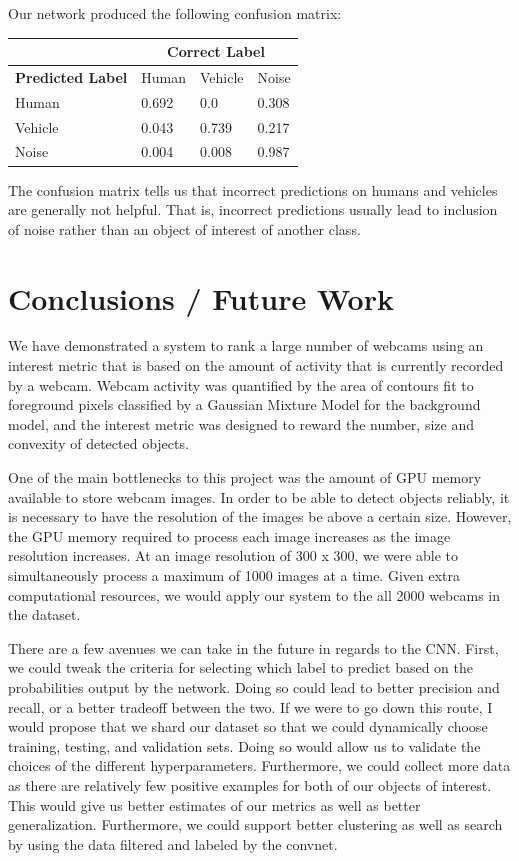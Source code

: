 \documentclass[10pt]{article} %
\begin{document}
Our network produced the following confusion matrix:
\begin{center}
  \begin{tabular}{ | m{8em} | m{5em}| m{5em} | m{5em} | }
    \hline
    & \multicolumn{3}{c|}{\textbf{Correct Label}} \\ 
    \hline
    \textbf{Predicted Label} & Human & Vehicle & Noise \\
    \hline
    Human & 0.692 & 0.0 & 0.308 \\
    \hline
    Vehicle & 0.043 & 0.739 & 0.217 \\
    \hline
    Noise & 0.004 & 0.008 & 0.987 \\
    \hline
  \end{tabular}
\end{center}
The confusion matrix tells us that incorrect predictions on humans and vehicles
are generally not helpful. That is, incorrect predictions usually lead to
inclusion of noise rather than an object of interest of another class.


\section{Conclusions / Future Work}
We have demonstrated a system to rank a large number of webcams using an interest metric that is based on the amount of activity that is currently recorded by a webcam. Webcam activity was quantified by the area of contours fit to foreground pixels classified by a Gaussian Mixture Model for the background model, and the interest metric was designed to reward the number, size and convexity of detected objects. 

One of the main bottlenecks to this project was the amount of GPU memory available to store webcam images. In order to be able to detect objects reliably, it is necessary to have the resolution of the images be above a certain size. However, the GPU memory required to process each image increases as the image resolution increases. At an image resolution of 300 x 300, we were able to simultaneously process a maximum of 1000 images at a time. Given extra computational resources, we would apply our system to the all 2000 webcams in the dataset.

There are a few avenues we can take in the future in regards to the CNN. First,
we could tweak the criteria for selecting which label to predict based on the
probabilities output by the network. Doing so could lead to better precision
and recall, or a better tradeoff between the two. If we were to go down this
route, I would propose that we shard our dataset so that we could dynamically
choose training, testing, and validation sets. Doing so would allow us to
validate the choices of the different hyperparameters. Furthermore, we could
collect more data as there are relatively few positive examples for both of our
objects of interest. This would give us better estimates of our metrics as well
as better generalization. Furthermore, we could support better clustering as
well as search by using the data filtered and labeled by the convnet.
\end{document}
